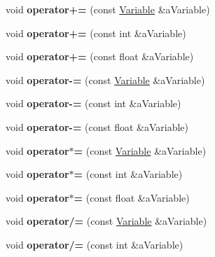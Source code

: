 \begin{DoxyCompactItemize}
\item 
\hypertarget{a00027_a7aa8b9995152f962c251fbcbff28399b}{void {\bfseries operator+=} (const \hyperlink{a00027}{Variable} \&a\+Variable)}\label{a00027_a7aa8b9995152f962c251fbcbff28399b}

\item 
\hypertarget{a00027_a14f76c8a893def148e3d45a07ef3a227}{void {\bfseries operator+=} (const int \&a\+Variable)}\label{a00027_a14f76c8a893def148e3d45a07ef3a227}

\item 
\hypertarget{a00027_aa15ad843f92054866a5b91661ad9aeb7}{void {\bfseries operator+=} (const float \&a\+Variable)}\label{a00027_aa15ad843f92054866a5b91661ad9aeb7}

\item 
\hypertarget{a00027_aff91cecf748f1c578f65390b8c1d3611}{void {\bfseries operator-\/=} (const \hyperlink{a00027}{Variable} \&a\+Variable)}\label{a00027_aff91cecf748f1c578f65390b8c1d3611}

\item 
\hypertarget{a00027_a7f6a8376fbc35ca758627ba11288e7a9}{void {\bfseries operator-\/=} (const int \&a\+Variable)}\label{a00027_a7f6a8376fbc35ca758627ba11288e7a9}

\item 
\hypertarget{a00027_ac50b02bdeb91289cb2f30c8561a659c9}{void {\bfseries operator-\/=} (const float \&a\+Variable)}\label{a00027_ac50b02bdeb91289cb2f30c8561a659c9}

\item 
\hypertarget{a00027_a3bd38cc163ab6c908d110b1cd468a035}{void {\bfseries operator$\ast$=} (const \hyperlink{a00027}{Variable} \&a\+Variable)}\label{a00027_a3bd38cc163ab6c908d110b1cd468a035}

\item 
\hypertarget{a00027_aca6bbd6730eed87adf4fa23810c3eee1}{void {\bfseries operator$\ast$=} (const int \&a\+Variable)}\label{a00027_aca6bbd6730eed87adf4fa23810c3eee1}

\item 
\hypertarget{a00027_aa7dd21e6d4bcb73d4cf659e10d062f44}{void {\bfseries operator$\ast$=} (const float \&a\+Variable)}\label{a00027_aa7dd21e6d4bcb73d4cf659e10d062f44}

\item 
\hypertarget{a00027_a8ac9083e343d9345fff3c5faaf8571e3}{void {\bfseries operator/=} (const \hyperlink{a00027}{Variable} \&a\+Variable)}\label{a00027_a8ac9083e343d9345fff3c5faaf8571e3}

\item 
\hypertarget{a00027_a44a8a5fea30597cc3a5c81715fb5babc}{void {\bfseries operator/=} (const int \&a\+Variable)}\label{a00027_a44a8a5fea30597cc3a5c81715fb5babc}


\end{DoxyCompactItemize}
